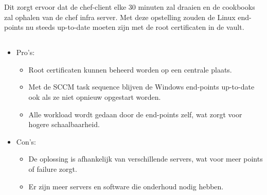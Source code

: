 Dit zorgt ervoor dat de chef-client elke 30 minuten zal draaien en de cookbooks zal ophalen van de chef infra server.
Met deze opstelling zouden de Linux end-points nu steeds up-to-date moeten zijn met de root certificaten in de vault. \\

\pagebreak

\subsection{}
\label{subsec:Pros_en_Cons_van_de_tweede_oplossing}

\begin{itemize}
    \item Pro's:
    \begin{itemize}
        \item Root certificaten kunnen beheerd worden op een centrale plaats.
        \item Met de SCCM task sequence blijven de Windows end-points up-to-date ook als ze niet opnieuw opgestart worden.
        \item Alle workload wordt gedaan door de end-points zelf, wat zorgt voor hogere schaalbaarheid.
    \end{itemize}
    \item Con's:
    \begin{itemize}
        \item De oplossing is afhankelijk van verschillende servers, wat voor meer points of failure zorgt.
        \item Er zijn meer servers en software die onderhoud nodig hebben.
    \end{itemize}
\end{itemize}

